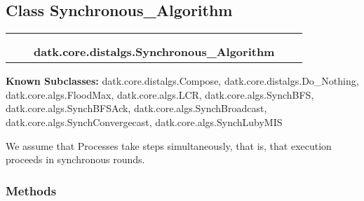 
\subsection{Class Synchronous\_Algorithm}

    \label{datk:core:distalgs:Synchronous_Algorithm}
\begin{tabular}{cccccc}
\multicolumn{2}{r}{\settowidth{\BCL}{datk.core.distalgs.Algorithm}\multirow{2}{\BCL}{datk.core.distalgs.Algorithm}}
&&
  \\\cline{3-3}
  &&\multicolumn{1}{c|}{}
&&
  \\
&&\multicolumn{2}{l}{\textbf{datk.core.distalgs.Synchronous\_Algorithm}}
\end{tabular}

\textbf{Known Subclasses:}
datk.core.distalgs.Compose,
    datk.core.distalgs.Do\_Nothing,
    datk.core.algs.FloodMax,
    datk.core.algs.LCR,
    datk.core.algs.SynchBFS,
    datk.core.algs.SynchBFSAck,
    datk.core.algs.SynchBroadcast,
    datk.core.algs.SynchConvergecast,
    datk.core.algs.SynchLubyMIS

We assume that Processes take steps simultaneously, that is, that execution
proceeds in synchronous rounds.



  \subsubsection{Methods}

    \label{datk:core:distalgs:Synchronous_Algorithm:execute}

    \vspace{0.5ex}

